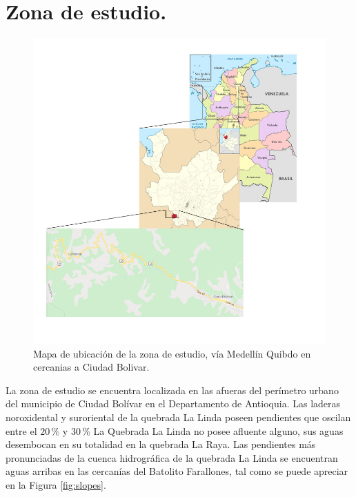 \chapter{Zona de estudio.}
\label{chap_zonaEstudio}

\begin{figure}[H]
\centering
\includegraphics[scale=0.6]{img/zona_estudio.jpg}
\caption{Mapa de ubicaci\'on de la zona de estudio, v\'ia Medell\'in Quibdo en cercanias a Ciudad Bolivar.}
\label{fig:ubicacion}
\end{figure}

La zona de estudio se encuentra localizada en las afueras del per\'imetro urbano del municipio de Ciudad Bol\'ivar en el Departamento de Antioquia. 
Las laderas noroxidental y suroriental de la quebrada La Linda poseen pendientes que oscilan entre el \(20\,\%\) y \(30\,\%\)
La Quebrada La Linda no posee afluente alguno, sus aguas desembocan en su totalidad en la quebrada La Raya.
Las pendientes m\'as pronunciadas de la cuenca hidrogr\'afica de la quebrada La Linda se encuentran aguas arribas en las cercan\'ias del Batolito Farallones, tal como se puede apreciar en la Figura \ref{fig:slopes}.


